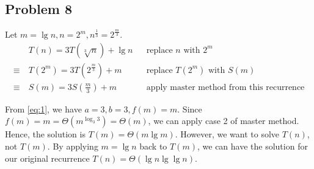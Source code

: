 \documentclass[a4paper]{article}
\makeatletter
\newenvironment{solution}
  {\begin{proof}[Solution]}
  {\end{proof}}
\renewenvironment{proof}[1][\proofname]{%
  \par\pushQED{\qed}\normalfont%
  \topsep6\p@\@plus6\p@\relax
  \trivlist\item[\hskip\labelsep\bfseries#1\@addpunct{.}]%
  \ignorespaces
}{%
  \popQED\endtrivlist\@endpefalse
}
\makeatother
\begin{document}
\subsection*{Problem 8}
\begin{solution}
  Let $m = \lg n, n = 2^m, n^{\frac{1}{3}} = 2^{\frac{m}{3}}$.
  \begin{align}
          & T(n) = 3T(\sqrt[3]{n}) + \lg n && \text{replace $n$ with $2^m$}\nonumber\\
    \equiv\ & T(2^m) = 3T(2^{\frac{m}{3}}) + m && \text{replace $T(2^m)$ with $S(m)$}\nonumber\\
    \equiv\ & S(m) = 3S(\frac{m}{3}) + m \label{eq:1} && \text{apply master method from this recurrence}
  \end{align}

  From \eqref{eq:1}, we have $a = 3, b = 3, f(m) = m$. Since $f(m) =m = \Theta(m^{\log_{3}{3}}) = \Theta(m)$, we can apply case 2 of master method. Hence, the solution is $T(m) = \Theta(m\lg m)$. However, we want to solve $T(n)$, not $T(m)$. By applying $m = \lg n$ back to $T(m)$, we can have the solution for our original recurrence $T(n) = \Theta(\lg n \lg \lg n)$.
\end{solution}
\end{document}
